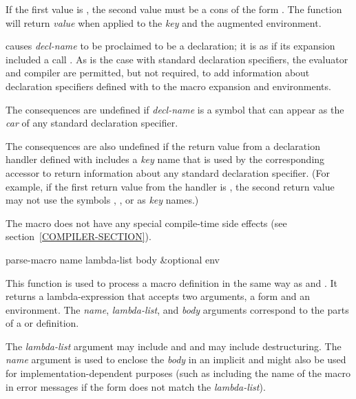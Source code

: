 \begin{newer}
\begin{defmac}
  If the first value is , the second value must be a cons
  of the form .  The function
   will return {\it value} when applied to the
  {\it key} and the augmented environment.

   causes {\it decl-name} to be proclaimed to be a
  declaration; it is as if its expansion included a call .  As is the case with standard
  declaration specifiers, the evaluator and compiler are permitted,
  but not required, to add information about declaration specifiers
  defined with  to the macro expansion and 
  environments.

  The consequences are undefined if {\it decl-name} is a symbol that can
  appear as the {\it car} of any standard declaration specifier.

  The consequences are also undefined if the return value from a 
  declaration handler defined with  includes a {\it key} name
  that is used by the corresponding accessor to return information about
  any standard declaration specifier.  (For example, if
  the first return value from the handler is , the second return
  value may not use the symbols , , or 
  as {\it key} names.)

  The  macro does not have any special compile-time
  side effects (see section~\ref{COMPILER-SECTION}).
\end{defmac}

\begin{defun}[Function]
parse-macro name lambda-list body &optional env

  This function is used to process a macro definition in the same way
  as  and .  It returns a lambda-expression that accepts
  two arguments, a form and an environment.  The {\it name}, {\it lambda-list},
  and {\it body} arguments correspond to the parts of a  or 
  definition.

  The {\it lambda-list} argument may include  and 
  and may include destructuring.
  The {\it name}
  argument is used to enclose the {\it body} in an implicit  and might also
  be used for implementation-dependent purposes (such as including the name of
  the macro in error messages if the form does not match the {\it lambda-list}).
\end{defun}


\end{newer}
